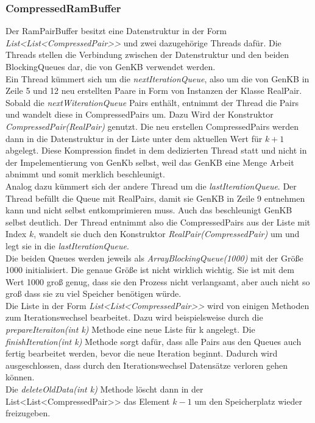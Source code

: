 \documentclass[12pt,a4paper]{article}
\begin{document}
\subsubsection{CompressedRamBuffer}
\label{sec:compressedrambuffer}
Der RamPairBuffer besitzt eine Datenstruktur in der Form \textit{List<List<CompressedPair>>} und zwei dazugehörige Threads dafür. Die Threads stellen die Verbindung zwischen der Datenstruktur und den beiden BlockingQueues dar, die von GenKB verwendet werden. \\
Ein Thread kümmert sich um die \textit{nextIterationQueue}, also um die von GenKB in Zeile 5 und 12  neu erstellten Paare in Form von Instanzen der Klasse RealPair. Sobald die \textit{nextWiterationQueue} Pairs enthält, entnimmt der Thread die Pairs und wandelt diese in CompressedPairs um. Dazu Wird der Konstruktor \textit{CompressedPair(RealPair)} genutzt. Die neu erstellen CompressedPairs werden dann in die Datenstruktur in der Liste unter dem aktuellen Wert für $k+1$ abgelegt. Diese Kompression findet in dem  dedizierten Thread statt und nicht in der Impelementierung von GenKb selbst, weil das GenKB eine Menge Arbeit abnimmt und somit merklich beschleunigt. \\
Analog dazu kümmert sich der andere Thread um die \textit{lastIterationQueue}. Der Thread befüllt die Queue mit RealPairs, damit sie GenKB in Zeile 9 entnehmen kann und nicht selbst entkomprimieren muss. Auch das beschleunigt GenKB selbst deutlich. Der Thread entnimmt also die CompressedPairs aus der Liste mit Index $k$, wandelt sie duch den Konstruktor \textit{RealPair(CompressedPair)} um und legt sie in die \textit{lastIterationQueue}. \\
Die beiden Queues werden jeweils als \textit{ArrayBlockingQueue(1000)} mit der Größe 1000 initialisiert. Die genaue Größe ist nicht wirklich wichtig. Sie ist mit dem Wert 1000 groß genug, dass sie den Prozess nicht verlangsamt, aber auch nicht so groß dass sie zu viel Speicher benötigen würde. \\
Die Liste in der Form \textit{List<List<CompressedPair>>} wird von einigen Methoden zum Iterationswechsel bearbeitet. Dazu wird beispielsweise durch die \textit{prepareIteraiton(int k)} Methode eine neue Liste für k angelegt. Die \textit{finishIteration(int k)} Methode sorgt dafür, dass alle Pairs aus den Queues auch fertig bearbeitet werden, bevor die neue Iteration beginnt. Dadurch wird ausgeschlossen, dass durch den Iterationswechsel Datensätze verloren gehen können. \\
Die \textit{deleteOldData(int k)} Methode löscht dann in der List<List<CompressedPair>> das Element $k-1$ um den Speicherplatz wieder freizugeben.
\end{document}

